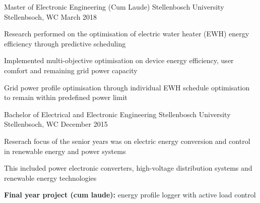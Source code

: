 
\begin{cventries}

  \cventry
    {Master of Electronic Engineering (Cum Laude)} %
    {Stellenbosch University} %
    {Stellenbsoch, WC} %
    {March 2018} %
    {
      \begin{cvitems} %
        \item {Research performed on the optimisation of electric water heater (EWH) energy efficiency through predictive scheduling}
        \item {Implemented multi-objective optimisation on device energy efficiency, user comfort and remaining grid power capacity}
        \item {Grid power profile optimisation through individual EWH schedule optimisation to remain within predefined power limit}
      \end{cvitems}
    }

  \cventry
    {Bachelor of Electrical and Electronic Engineering} %
    {Stellenbosch University} %
    {Stellenbsoch, WC} %
    {December 2015} %
    {
      \begin{cvitems} %
        \item {Reserach focus of the senior years was on electric energy conversion and control in renewable energy and power systems}
        \item {This included power electronic converters, high-voltage distribution systems and renewable energy technologies}
        \item {\textbf {Final year project (cum laude):} energy profile logger with active load control}
      \end{cvitems}
    }

    

\end{cventries}
